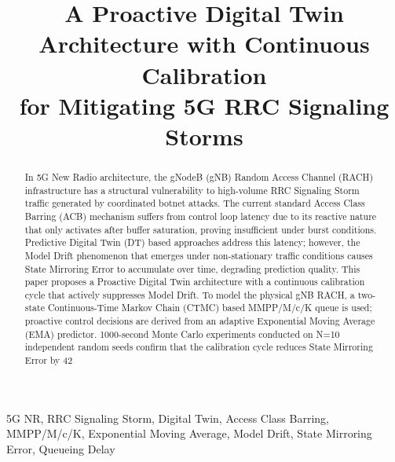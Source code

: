 \documentclass[conference]{IEEEtran}
\begin{document}

\title{A Proactive Digital Twin Architecture with Continuous Calibration\\for Mitigating 5G RRC Signaling Storms}

\author{%
}

\maketitle

\begin{abstract}
In 5G New Radio architecture, the gNodeB (gNB) Random Access Channel (RACH) infrastructure has a structural vulnerability to high-volume RRC Signaling Storm traffic generated by coordinated botnet attacks. The current standard Access Class Barring (ACB) mechanism suffers from control loop latency due to its reactive nature that only activates after buffer saturation, proving insufficient under burst conditions. Predictive Digital Twin (DT) based approaches address this latency; however, the Model Drift phenomenon that emerges under non-stationary traffic conditions causes State Mirroring Error to accumulate over time, degrading prediction quality. This paper proposes a Proactive Digital Twin architecture with a continuous calibration cycle that actively suppresses Model Drift. To model the physical gNB RACH, a two-state Continuous-Time Markov Chain (CTMC) based MMPP/M/c/K queue is used; proactive control decisions are derived from an adaptive Exponential Moving Average (EMA) predictor. 1000-second Monte Carlo experiments conducted on N=10 independent random seeds confirm that the calibration cycle reduces State Mirroring Error by 42%
\end{abstract}

\begin{IEEEkeywords}
5G NR, RRC Signaling Storm, Digital Twin, Access Class Barring, MMPP/M/c/K,
Exponential Moving Average, Model Drift, State Mirroring Error, Queueing Delay
\end{IEEEkeywords}
\end{document}

